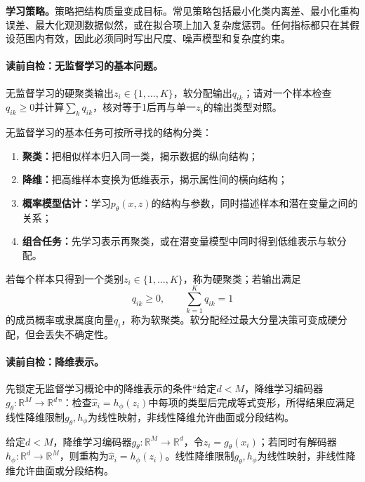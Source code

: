 \label{struct:V4-C01-CH09}
\textbf{学习策略。}策略把结构质量变成目标。常见策略包括最小化类内离差、最小化重构误差、最大化观测数据似然，或在拟合项上加入复杂度惩罚。任何指标都只在其假设范围内有效，因此必须同时写出尺度、噪声模型和复杂度约束。

\paragraph{读前自检：无监督学习的基本问题。}无监督学习的硬聚类输出$z_i\in\{1,\ldots,K\}$，软分配输出$q_{ik}$；请对一个样本检查$q_{ik}\ge0$并计算$\sum_kq_{ik}$，核对等于1后再与单一$z_i$的输出类型对照。\par

无监督学习的基本任务可按所寻找的结构分类：
\begin{enumerate}[leftmargin=2.2em]
  \item \textbf{聚类：}把相似样本归入同一类，揭示数据的纵向结构；
  \item \textbf{降维：}把高维样本变换为低维表示，揭示属性间的横向结构；
  \item \textbf{概率模型估计：}学习$p_\theta(x,z)$的结构与参数，同时描述样本和潜在变量之间的关系；
  \item \textbf{组合任务：}先学习表示再聚类，或在潜变量模型中同时得到低维表示与软分配。
\end{enumerate}

\begin{definition}[硬聚类与软聚类]\label{def:V4-C01-hard-soft}
若每个样本只得到一个类别$z_i\in\{1,\ldots,K\}$，称为硬聚类；若输出满足
\[
q_{ik}\geq0,\qquad \sum_{k=1}^{K}q_{ik}=1
\]
的成员概率或隶属度向量$q_i$，称为软聚类。软分配经过最大分量决策可变成硬分配，但会丢失不确定性。
\end{definition}

\paragraph{读前自检：降维表示。}先锁定无监督学习概论中的降维表示的条件“给定$d<M$，降维学习编码器$g_\theta:\mathbb R^M\to\mathbb R^d$”：检查$\widehat x_i=h_\phi(z_i)$中每项的类型后完成等式变形，所得结果应满足线性降维限制$g_\theta,h_\phi$为线性映射，非线性降维允许曲面或分段结构。\par

\begin{definition}[降维表示]\label{def:V4-C01-dimred}
给定$d<M$，降维学习编码器$g_\theta:\mathbb R^M\to\mathbb R^d$，令$z_i=g_\theta(x_i)$；若同时有解码器$h_\phi:\mathbb R^d\to\mathbb R^M$，则重构为$\widehat x_i=h_\phi(z_i)$。线性降维限制$g_\theta,h_\phi$为线性映射，非线性降维允许曲面或分段结构。
\end{definition}

